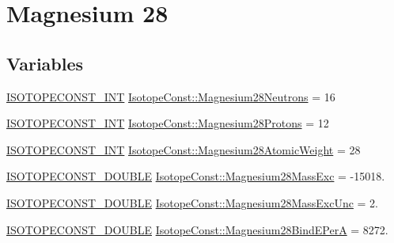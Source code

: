\hypertarget{group___isotope_const-_magnesium-_mg28}{}\section{Magnesium 28}
\label{group___isotope_const-_magnesium-_mg28}
\subsection*{Variables}
\begin{DoxyCompactItemize}
\item 
\mbox{\hyperlink{group___isotope_const-_macros_ga5f18360b3e99483a35c32d789e62621c}{I\+S\+O\+T\+O\+P\+E\+C\+O\+N\+S\+T\+\_\+\+I\+NT}} \mbox{\hyperlink{group___isotope_const-_magnesium-_mg28_ga2a310fce7ba6fbd73db657fc3d57b2d7}{Isotope\+Const\+::\+Magnesium28\+Neutrons}} = 16
\item 
\mbox{\hyperlink{group___isotope_const-_macros_ga5f18360b3e99483a35c32d789e62621c}{I\+S\+O\+T\+O\+P\+E\+C\+O\+N\+S\+T\+\_\+\+I\+NT}} \mbox{\hyperlink{group___isotope_const-_magnesium-_mg28_ga23d908e94f7fa6531275c6c902df4b2c}{Isotope\+Const\+::\+Magnesium28\+Protons}} = 12
\item 
\mbox{\hyperlink{group___isotope_const-_macros_ga5f18360b3e99483a35c32d789e62621c}{I\+S\+O\+T\+O\+P\+E\+C\+O\+N\+S\+T\+\_\+\+I\+NT}} \mbox{\hyperlink{group___isotope_const-_magnesium-_mg28_ga0a10f8888a60452e5165047986ed619e}{Isotope\+Const\+::\+Magnesium28\+Atomic\+Weight}} = 28
\item 
\mbox{\hyperlink{group___isotope_const-_macros_ga8f45a7272ce02c0b4c65c44636ed719a}{I\+S\+O\+T\+O\+P\+E\+C\+O\+N\+S\+T\+\_\+\+D\+O\+U\+B\+LE}} \mbox{\hyperlink{group___isotope_const-_magnesium-_mg28_gaca5ff20aedca70c32fa7e143a9c74e72}{Isotope\+Const\+::\+Magnesium28\+Mass\+Exc}} = -\/15018.
\item 
\mbox{\hyperlink{group___isotope_const-_macros_ga8f45a7272ce02c0b4c65c44636ed719a}{I\+S\+O\+T\+O\+P\+E\+C\+O\+N\+S\+T\+\_\+\+D\+O\+U\+B\+LE}} \mbox{\hyperlink{group___isotope_const-_magnesium-_mg28_ga91616139df02720279c804965c74d347}{Isotope\+Const\+::\+Magnesium28\+Mass\+Exc\+Unc}} = 2.
\item 
\mbox{\hyperlink{group___isotope_const-_macros_ga8f45a7272ce02c0b4c65c44636ed719a}{I\+S\+O\+T\+O\+P\+E\+C\+O\+N\+S\+T\+\_\+\+D\+O\+U\+B\+LE}} \mbox{\hyperlink{group___isotope_const-_magnesium-_mg28_ga6bad78e67a930e99a5f02cf73a7bddf1}{Isotope\+Const\+::\+Magnesium28\+Bind\+E\+PerA}} = 8272.
\item 

\end{DoxyCompactItemize}
